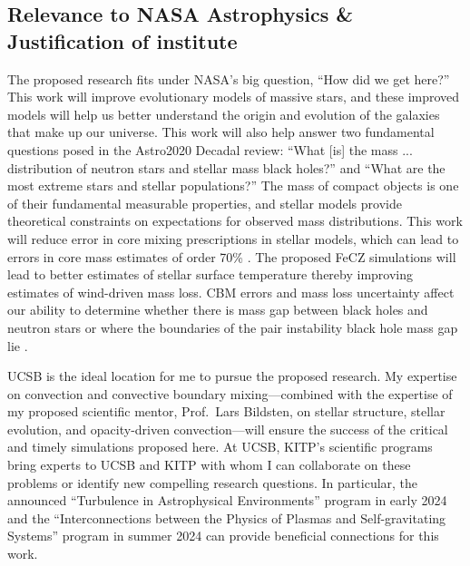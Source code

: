 \documentclass[12pt]{article} %
\begin{document}
\subsection{Relevance to NASA Astrophysics \& Justification of institute} \vspace{-0.15cm}
The proposed research fits under NASA's big question, ``How did we get here?''
This work will improve evolutionary models of massive stars, and these improved models will help us better understand the origin and evolution of the galaxies that make up our universe.
This work will also help answer two fundamental questions posed in the Astro2020 Decadal review: ``What [is] the mass ... distribution of neutron stars and stellar mass black holes?'' and ``What are the most extreme stars and stellar populations?''
The mass of compact objects is one of their fundamental measurable properties, and stellar models provide theoretical constraints on expectations for observed mass distributions.
This work will reduce error in core mixing prescriptions in stellar models, which can lead to errors in core mass estimates of order 70\% \citep{kaiser_etal_2020}.
The proposed FeCZ simulations will lead to better estimates of stellar surface temperature thereby improving estimates of wind-driven mass loss.
CBM errors and mass loss uncertainty affect our ability to determine whether there is mass gap between black holes and neutron stars \citep{vanson_etal_2022} or where the boundaries of the pair instability black hole mass gap lie \citep{farmer_etal_2019}.

UCSB is the ideal location for me to pursue the proposed research.
My expertise on convection and convective boundary mixing---combined with the expertise of my proposed scientific mentor, Prof.~Lars Bildsten, on stellar structure, stellar evolution, and opacity-driven convection---will ensure the success of the critical and timely simulations proposed here.
At UCSB, KITP's scientific programs bring experts to UCSB and KITP with whom I can collaborate on these problems or identify new compelling research questions.
In particular, the announced ``Turbulence in Astrophysical Environments'' program in early 2024 and the ``Interconnections between the Physics of Plasmas and Self-gravitating Systems'' program in summer 2024 can provide beneficial connections for this work.

\vspace{-0.5cm}

\end{document}

